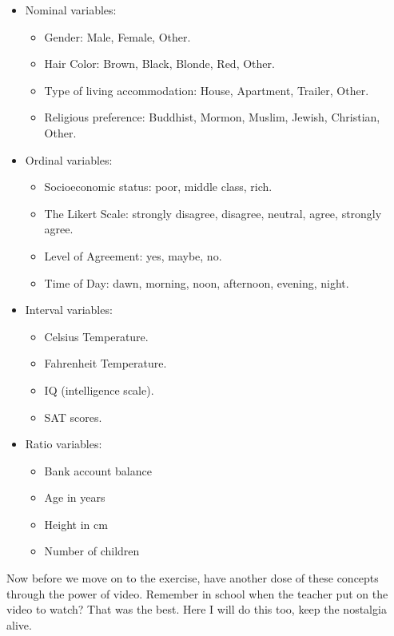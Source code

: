 \documentclass[]{book}
\providecommand{\tightlist}{%
  \setlength{\itemsep}{0pt}\setlength{\parskip}{0pt}}
\theoremstyle{definition}
\theoremstyle{definition}
\theoremstyle{definition}
\theoremstyle{remark}
\begin{document}
\begin{itemize}
\tightlist
\item
  Nominal variables:

  \begin{itemize}
  \tightlist
  \item
    Gender: Male, Female, Other.
  \item
    Hair Color: Brown, Black, Blonde, Red, Other.
  \item
    Type of living accommodation: House, Apartment, Trailer, Other.
  \item
    Religious preference: Buddhist, Mormon, Muslim, Jewish, Christian,
    Other.
  \end{itemize}
\item
  Ordinal variables:

  \begin{itemize}
  \tightlist
  \item
    Socioeconomic status: poor, middle class, rich.
  \item
    The Likert Scale: strongly disagree, disagree, neutral, agree,
    strongly agree.
  \item
    Level of Agreement: yes, maybe, no.
  \item
    Time of Day: dawn, morning, noon, afternoon, evening, night.
  \end{itemize}
\item
  Interval variables:

  \begin{itemize}
  \tightlist
  \item
    Celsius Temperature.
  \item
    Fahrenheit Temperature.
  \item
    IQ (intelligence scale).
  \item
    SAT scores.
  \end{itemize}
\item
  Ratio variables:

  \begin{itemize}
  \tightlist
  \item
    Bank account balance
  \item
    Age in years
  \item
    Height in cm
  \item
    Number of children
  \end{itemize}
\end{itemize}

Now before we move on to the exercise, have another dose of these
concepts through the power of video. Remember in school when the teacher
put on the video to watch? That was the best. Here I will do this too,
keep the nostalgia alive.
\end{document}
